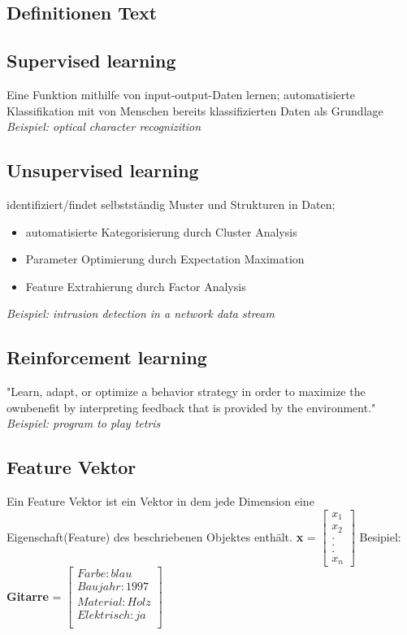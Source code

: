 \documentclass[11pt,a4paper]{article}
\begin{document}
\begin{flushleft}
\newpage
\section{Definitionen Text}
\subsection{Supervised learning} 
    Eine Funktion mithilfe von input-output-Daten lernen; \newline
    automatisierte Klassifikation mit von Menschen bereits klassifizierten Daten als Grundlage \newline
    \textit{Beispiel: optical character recognizition}
    
\subsection{Unsupervised learning}
    identifiziert/findet selbstständig Muster und Strukturen in Daten; \newline
    \begin{itemize}
        \item automatisierte Kategorisierung durch Cluster Analysis
        \item Parameter Optimierung durch Expectation Maximation
        \item Feature Extrahierung durch Factor Analysis
    \end{itemize}
    \textit{Beispiel: intrusion detection in a network data stream}
    
\subsection{Reinforcement learning}
    "Learn, adapt, or optimize a behavior strategy in order to maximize the ownbenefit by interpreting feedback that is provided by the environment."
    \textit{Beispiel: program to play tetris}

\subsection{Feature Vektor}
    Ein Feature Vektor ist ein Vektor in dem jede Dimension eine Eigenschaft(Feature) des beschriebenen Objektes enthält.\newline
    \textbf{x} =
    $\begin{bmatrix}
    x_1\\
    x_2\\
    .\\
    .\\
    .\\
    x_n
    \end{bmatrix}$
    \quad Besipiel: \textbf{Gitarre} = 
    $\begin{bmatrix}
    Farbe: blau\\
    Baujahr: 1997\\
    Material: Holz\\
    Elektrisch: ja\\
    \end{bmatrix}$



\end{flushleft}
\end{document}
